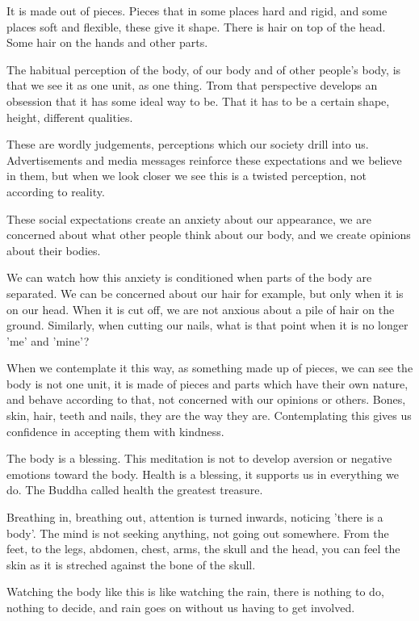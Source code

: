 It is made out of pieces. Pieces that in some places hard and rigid, and
some places soft and flexible, these give it shape. There is hair on top
of the head. Some hair on the hands and other parts.

The habitual perception of the body, of our body and of other people's
body, is that we see it as one unit, as one thing. Trom that perspective
develops an obsession that it has some ideal way to be. That it has to
be a certain shape, height, different qualities.

These are wordly judgements, perceptions which our society drill into
us. Advertisements and media messages reinforce these expectations and
we believe in them, but when we look closer we see this is a twisted
perception, not according to reality.

These social expectations create an anxiety about our appearance, we are
concerned about what other people think about our body, and we create
opinions about their bodies.

We can watch how this anxiety is conditioned when parts of the body are
separated. We can be concerned about our hair for example, but only when
it is on our head. When it is cut off, we are not anxious about a pile
of hair on the ground. Similarly, when cutting our nails, what is that
point when it is no longer 'me' and 'mine'?

When we contemplate it this way, as something made up of pieces, we can
see the body is not one unit, it is made of pieces and parts which have
their own nature, and behave according to that, not concerned with our
opinions or others. Bones, skin, hair, teeth and nails, they are the way
they are. Contemplating this gives us confidence in accepting them with
kindness.

The body is a blessing. This meditation is not to develop aversion or
negative emotions toward the body. Health is a blessing, it supports us
in everything we do. The Buddha called health the greatest treasure.

Breathing in, breathing out, attention is turned inwards, noticing
'there is a body'. The mind is not seeking anything, not going out
somewhere. From the feet, to the legs, abdomen, chest, arms, the skull
and the head, you can feel the skin as it is streched against the bone
of the skull.

Watching the body like this is like watching the rain, there is nothing
to do, nothing to decide, and rain goes on without us having to get
involved.

